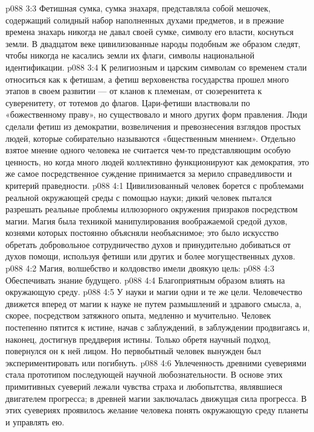 \vs p088 3:3 Фетишная сумка, сумка знахаря, представляла собой мешочек, содержащий солидный набор наполненных духами предметов, и в прежние времена знахарь никогда не давал своей сумке, символу его власти, коснуться земли. В двадцатом веке цивилизованные народы подобным же образом следят, чтобы никогда не касались земли их флаги, символы национальной идентификации.
\vs p088 3:4 К религиозным и царским символам со временем стали относиться как к фетишам, а фетиш верховенства государства прошел много этапов в своем развитии --- от кланов к племенам, от сюзеренитета к суверенитету, от тотемов до флагов. Цари\hyp{}фетиши властвовали по «божественному праву», но существовало и много других форм правления. Люди сделали фетиш из демократии, возвеличения и превознесения взглядов простых людей, которые собирательно называются «бщественным мнением». Отдельно взятое мнение одного человека не считается чем\hyp{}то представляющим особую ценность, но когда много людей коллективно функционируют как демократия, это же самое посредственное суждение принимается за мерило справедливости и критерий праведности.
\vs p088 4:1 Цивилизованный человек борется с проблемами реальной окружающей среды с помощью науки; дикий человек пытался разрешать реальные проблемы иллюзорного окружения призраков посредством магии. Магия была техникой манипулирования воображаемой средой духов, кознями которых постоянно объясняли необъяснимое; это было искусство обретать добровольное сотрудничество духов и принудительно добиваться от духов помощи, используя фетиши или других и более могущественных духов.
\vs p088 4:2 Магия, волшебство и колдовство имели двоякую цель:
\vs p088 4:3 \bibnobreakspace Обеспечивать знание будущего.
\vs p088 4:4 \bibnobreakspace Благоприятным образом влиять на окружающую среду.
\vs p088 4:5 \pc У науки и магии одни и те же цели. Человечество движется вперед от магии к науке не путем размышлений и здравого смысла, а, скорее, посредством затяжного опыта, медленно и мучительно. Человек постепенно пятится к истине, начав с заблуждений, в заблуждении продвигаясь и, наконец, достигнув преддверия истины. Только обретя научный подход, повернулся он к ней лицом. Но первобытный человек вынужден был экспериментировать или погибнуть.
\vs p088 4:6 Увлеченность древними суевериями стала прототипом последующей научной любознательности. В основе этих примитивных суеверий лежали чувства страха и любопытства, являвшиеся двигателем прогресса; в древней магии заключалась движущая сила прогресса. В этих суевериях проявилось желание человека понять окружающую среду планеты и управлять ею.
